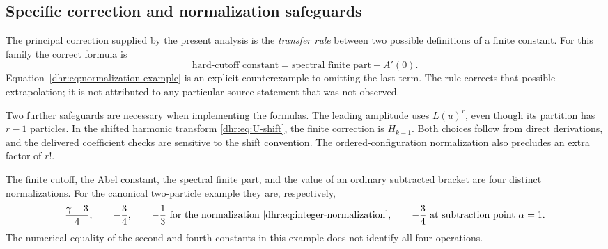 \documentclass[11pt,letterpaper]{article}
\numberwithin{equation}{section}
\theoremstyle{definition}\newtheorem{definition}[theorem]{Definition}
\theoremstyle{remark}\newtheorem{remark}[theorem]{Remark}
\begin{document}
\subsection{Specific correction and normalization safeguards}
The principal correction supplied by the present analysis is the
\emph{transfer rule} between two possible definitions of a finite
constant. For this family the correct formula is
\[
 \text{hard-cutoff constant}
 =\text{spectral finite part}-A'(0).
\]
Equation~\eqref{dhr:eq:normalization-example} is an explicit
counterexample to omitting the last term. The rule corrects that
possible extrapolation; it is not attributed to any particular source
statement that was not observed.

Two further safeguards are necessary when implementing the formulas.
The leading amplitude uses $L(u)^r$, even though its partition has
$r-1$ particles. In the shifted harmonic transform
\eqref{dhr:eq:U-shift}, the finite correction is $H_{k-1}$.
Both choices follow from direct derivations, and the delivered
coefficient checks are sensitive to the shift convention. The
ordered-configuration normalization also precludes an extra factor
of $r!$.

The finite cutoff, the Abel constant, the spectral finite part, and the
value of an ordinary subtracted bracket are four distinct normalizations.
For the canonical two-particle example they are, respectively,
\[
 \frac{\gamma-3}{4},\qquad -\frac34,\qquad
 -\frac13\ \text{for the normalization \eqref{dhr:eq:integer-normalization}},
 \qquad -\frac34\ \text{at subtraction point }\alpha=1.
\]
The numerical equality of the second and fourth constants in this
example does not identify all four operations.
\end{document}
